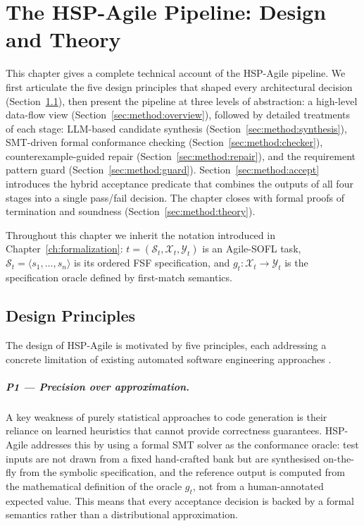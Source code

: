 
\chapter{The HSP-Agile Pipeline: Design and Theory}
\label{ch:method}

This chapter gives a complete technical account of the HSP-Agile pipeline.
We first articulate the five design principles that shaped every architectural
decision (Section~\ref{sec:method:principles}), then present the pipeline at
three levels of abstraction: a high-level data-flow view
(Section~\ref{sec:method:overview}), followed by detailed treatments of each
stage: LLM-based candidate synthesis (Section~\ref{sec:method:synthesis}),
SMT-driven formal conformance checking (Section~\ref{sec:method:checker}),
counterexample-guided repair (Section~\ref{sec:method:repair}), and the
requirement pattern guard (Section~\ref{sec:method:guard}).
Section~\ref{sec:method:accept} introduces the hybrid acceptance predicate
that combines the outputs of all four stages into a single pass/fail decision.
The chapter closes with formal proofs of termination and soundness
(Section~\ref{sec:method:theory}).

Throughout this chapter we inherit the notation introduced in
Chapter~\ref{ch:formalization}: $t = (\mathcal{S}_t, \mathcal{X}_t,
\mathcal{Y}_t)$ is an Agile-SOFL task, $\mathcal{S}_t = \langle
s_1,\ldots,s_n\rangle$ is its ordered FSF specification, and $g_t :
\mathcal{X}_t \to \mathcal{Y}_t$ is the specification oracle defined by
first-match semantics.

\section{Design Principles}
\label{sec:method:principles}

The design of HSP-Agile is motivated by five principles, each addressing a
concrete limitation of existing automated software engineering approaches
\citep{woodcock2009formalsurvey, chen2021codex}.

\paragraph{P1 — Precision over approximation.}
A key weakness of purely statistical approaches to code generation is their
reliance on learned heuristics that cannot provide correctness guarantees.
HSP-Agile addresses this by using a formal SMT solver as the conformance
oracle: test inputs are not drawn from a fixed hand-crafted bank but are
synthesised on-the-fly from the symbolic specification, and the reference
output is computed from the mathematical definition of the oracle $g_t$, not
from a human-annotated expected value.  This means that every acceptance
decision is backed by a formal semantics rather than a distributional
approximation.

